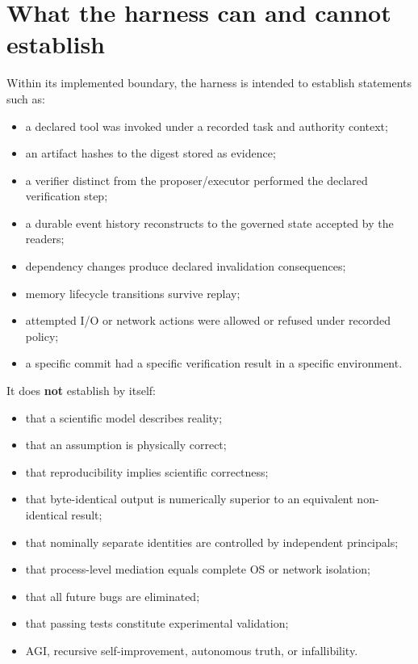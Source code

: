 \section{What the harness can and cannot establish}

Within its implemented boundary, the harness is intended to establish statements such as:

\begin{itemize}
  \item a declared tool was invoked under a recorded task and authority context;
  \item an artifact hashes to the digest stored as evidence;
  \item a verifier distinct from the proposer/executor performed the declared verification step;
  \item a durable event history reconstructs to the governed state accepted by the readers;
  \item dependency changes produce declared invalidation consequences;
  \item memory lifecycle transitions survive replay;
  \item attempted I/O or network actions were allowed or refused under recorded policy;
  \item a specific commit had a specific verification result in a specific environment.
\end{itemize}

It does \textbf{not} establish by itself:

\begin{itemize}
  \item that a scientific model describes reality;
  \item that an assumption is physically correct;
  \item that reproducibility implies scientific correctness;
  \item that byte-identical output is numerically superior to an equivalent non-identical result;
  \item that nominally separate identities are controlled by independent principals;
  \item that process-level mediation equals complete OS or network isolation;
  \item that all future bugs are eliminated;
  \item that passing tests constitute experimental validation;
  \item AGI, recursive self-improvement, autonomous truth, or infallibility.
\end{itemize}

